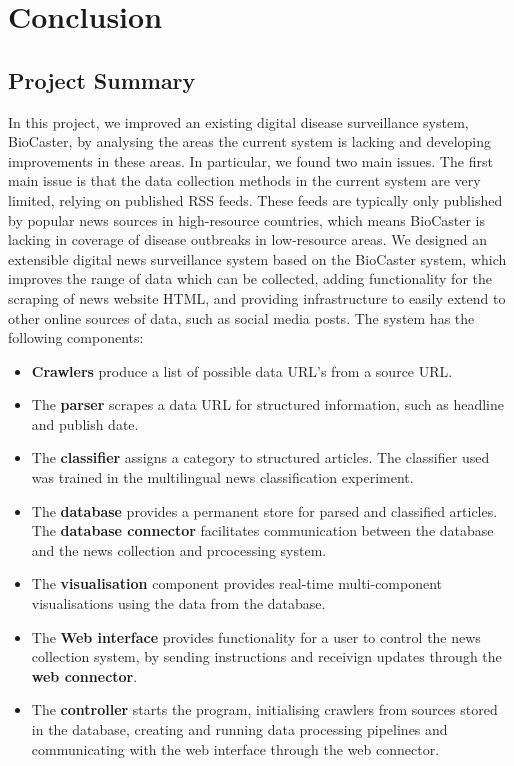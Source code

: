 \documentclass{l4proj}
\begin{document}


\chapter{Conclusion}    
\section{Project Summary}
In this project, we improved an existing digital disease surveillance system, BioCaster, by analysing the areas the current system is lacking and developing improvements in these areas. In particular, we found two main issues. The first main issue is that the data collection methods in the current system are very limited, relying on published RSS feeds. These feeds are typically only published by popular news sources in high-resource countries, which means BioCaster is lacking in coverage of disease outbreaks in low-resource areas. We designed an extensible digital news surveillance system based on the BioCaster system, which improves the range of data which can be collected, adding functionality for the scraping of news website HTML, and providing infrastructure to easily extend to other online sources of data, such as social media posts. The system has the following components:
\begin{itemize}
    \item \textbf{Crawlers} produce a list of possible data URL's from a source URL.
    \item The \textbf{parser} scrapes a data URL for structured information, such as headline and publish date.
    \item The \textbf{classifier} assigns a category to structured articles. The classifier used was trained in the multilingual news classification experiment.
    \item The \textbf{database} provides a permanent store for parsed and classified articles. The \textbf{database connector} facilitates communication between the database and the news collection and prcocessing system.
    \item The \textbf{visualisation} component provides real-time multi-component visualisations using the data from the database.
    \item The \textbf{Web interface} provides functionality for a user to control the news collection system, by sending instructions and receivign updates through the \textbf{web connector}.
    \item The \textbf{controller} starts the program, initialising crawlers from sources stored in the database, creating and running data processing pipelines and communicating with the web interface through the web connector.
\end{itemize}
\end{document}
